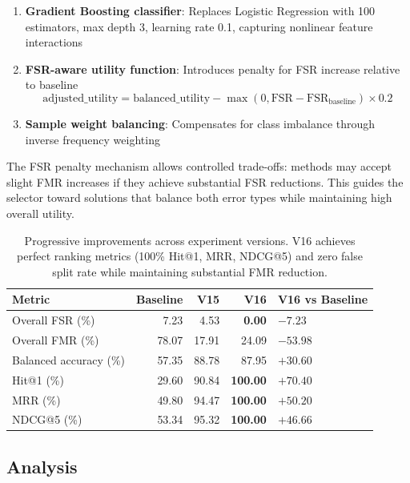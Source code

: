 \begin{enumerate}
    \item \textbf{Gradient Boosting classifier}: Replaces Logistic Regression with 100 estimators, max depth 3, learning rate 0.1, capturing nonlinear feature interactions
    \item \textbf{FSR-aware utility function}: Introduces penalty for FSR increase relative to baseline
    \begin{equation}
        \text{adjusted\_utility} = \text{balanced\_utility} - \max(0, \text{FSR} - \text{FSR}_{\text{baseline}}) \times 0.2
    \end{equation}
    \item \textbf{Sample weight balancing}: Compensates for class imbalance through inverse frequency weighting
\end{enumerate}

The FSR penalty mechanism allows controlled trade-offs: methods may accept slight FMR increases if they achieve substantial FSR reductions. This guides the selector toward solutions that balance both error types while maintaining high overall utility.

\begin{table}[tb]
\centering
\small
\setlength{\tabcolsep}{4pt}
\begin{tabularx}{\linewidth}{l r r r X}
\toprule
Metric & Baseline & V15 & V16 & V16 vs Baseline \\
\midrule
Overall FSR (\%) & 7.23 & 4.53 & \textbf{0.00} & $-7.23$ \\
Overall FMR (\%) & 78.07 & 17.91 & 24.09 & $-53.98$ \\
Balanced accuracy (\%) & 57.35 & 88.78 & 87.95 & $+30.60$ \\
Hit@1 (\%) & 29.60 & 90.84 & \textbf{100.00} & $+70.40$ \\
MRR (\%) & 49.80 & 94.47 & \textbf{100.00} & $+50.20$ \\
NDCG@5 (\%) & 53.34 & 95.32 & \textbf{100.00} & $+46.66$ \\
\bottomrule
\end{tabularx}
\caption{Progressive improvements across experiment versions. V16 achieves perfect ranking metrics (100\% Hit@1, MRR, NDCG@5) and zero false split rate while maintaining substantial FMR reduction.}
\label{tab:balanced-innovation-v16-comparison}
\end{table}

\subsection{Analysis}

